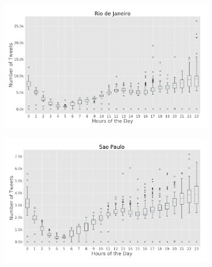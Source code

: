 \begin{figure}[!htbp]
	\centering
	\begin{subfigure}[htbp]{0.45\textwidth}
		\centering
		\includegraphics[width=1\linewidth]{figures/rio_box_plt_hour_of_day.png}
		\caption{}
		\label{subfig:riodejaneiro_box_plot_hour_of_day}
	\end{subfigure}%
	\quad
	\begin{subfigure}[htbp]{0.45\textwidth}
		\centering
		\includegraphics[width=1\linewidth]{figures/sp_box_plt_hour_of_day.png}
		\caption{}
		\label{subfig:saopaulo_box_plot_hour_of_day}
	\end{subfigure}
	
	\medskip
	

\end{figure}
